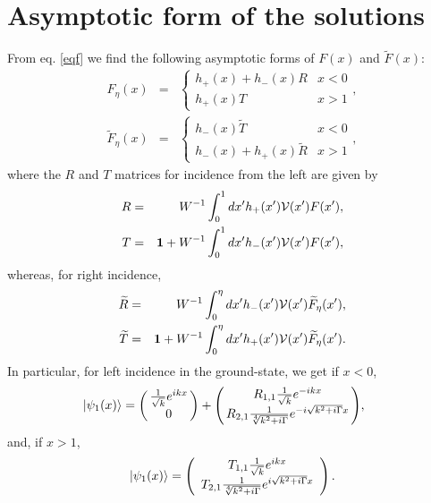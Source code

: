 \section{Asymptotic form of the solutions}
%
From eq. \eqref{eqf} we find the following asymptotic forms of  $F(x)$ and $\widetilde{F}(x)$:
%
\begin{eqnarray}
	F_{\eta}(x)&=& \begin{cases}
	h_{+}(x)+h_{-}(x)R  & x<0  \\ h_{+}(x)T & x>1
	\end{cases},
	\nonumber\\
	\widetilde{F}_{\eta}(x)&=&\begin{cases}
	h_{-}(x)\widetilde{T}  &  x<0  \\ h_{-}(x)+h_{+}(x)\widetilde{R} & x>1
	\end{cases},
\end{eqnarray}
%
where the $R$ and $T$ matrices for incidence from the left are given by
%
\begin{eqnarray}
	R &=& W^{-1}\int_{0}^{1} dx' h_{+}(x'){\cal V}(x')F (x'),
	\nonumber\\
	T &=& \mathbf{1}+W^{-1}\int_{0}^{1} dx' h_{-}(x'){\cal V}(x')F (x'),
\end{eqnarray}
%
whereas, for right incidence,
%
\begin{eqnarray}
	\widetilde{R} &=& W^{-1}\int_{0}^{\eta} dx' h_{-}(x'){\cal V}(x')\widetilde{F}_{\eta}(x'),
	\nonumber\\
	\widetilde{T} &=& \mathbf{1}+W^{-1}\int_{0}^{\eta} dx' h_{+}(x'){\cal V}(x')\widetilde{F}_{\eta}(x').
\end{eqnarray}
%
In particular, for left incidence  in the ground-state, we get  if $x < 0$,
%
\begin{eqnarray}
	\hspace*{-.5cm}|\psi_1 (x)\ra = \left(\!\!\begin{array}{c} \frac{1}{\sqrt{k}}e^{i k x} \\ 0\end{array}\!\!\right)
	+ \left(\!\!\begin{array}{c}
	R_{1,1} \frac{1}{\sqrt{k}}e^{-i k x} \\
	R_{2,1} \frac{1}{\sqrt[4]{k^2+i \Gamma}} e^{- i \sqrt{k^2+i \Gamma} x}
	\end{array}\!\!\right)\!,
	\label{as-}
\end{eqnarray}
%
and, if $x>1$,
%
\begin{eqnarray}
	|\psi_1 (x)\ra = \left(\begin{array}{c}
	T_{1,1} \frac{1}{\sqrt{k}}e^{i k x} \\
	T_{2,1} \frac{1}{\sqrt[4]{k^2+i \Gamma}} e^{i \sqrt{k^2+i \Gamma} x}
	\end{array}\right).
	\label{as+}
\end{eqnarray}
